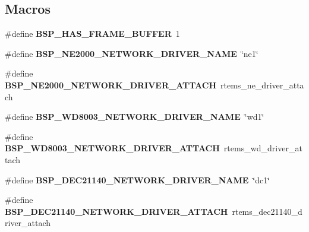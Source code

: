 \subsection*{Macros}
\begin{DoxyCompactItemize}
\item 
\mbox{\label{group__RTEMSBSPsI386_ga18988f05911c2a1adcea89019029280b}} 
\#define {\bfseries B\+S\+P\+\_\+\+H\+A\+S\+\_\+\+F\+R\+A\+M\+E\+\_\+\+B\+U\+F\+F\+ER}~1
\item 
\mbox{\label{group__RTEMSBSPsI386_gac6c911dfcfde7c091f015e594985edd4}} 
\#define {\bfseries B\+S\+P\+\_\+\+N\+E2000\+\_\+\+N\+E\+T\+W\+O\+R\+K\+\_\+\+D\+R\+I\+V\+E\+R\+\_\+\+N\+A\+ME}~\char`\"{}ne1\char`\"{}
\item 
\mbox{\label{group__RTEMSBSPsI386_ga692f56bd01099425e29a1ff59164c65f}} 
\#define {\bfseries B\+S\+P\+\_\+\+N\+E2000\+\_\+\+N\+E\+T\+W\+O\+R\+K\+\_\+\+D\+R\+I\+V\+E\+R\+\_\+\+A\+T\+T\+A\+CH}~rtems\+\_\+ne\+\_\+driver\+\_\+attach
\item 
\mbox{\label{group__RTEMSBSPsI386_gab8c3482218e42840b0e7b53f92565ea3}} 
\#define {\bfseries B\+S\+P\+\_\+\+W\+D8003\+\_\+\+N\+E\+T\+W\+O\+R\+K\+\_\+\+D\+R\+I\+V\+E\+R\+\_\+\+N\+A\+ME}~\char`\"{}wd1\char`\"{}
\item 
\mbox{\label{group__RTEMSBSPsI386_ga65d37cd2441e3d6df5c8a2454f5909cb}} 
\#define {\bfseries B\+S\+P\+\_\+\+W\+D8003\+\_\+\+N\+E\+T\+W\+O\+R\+K\+\_\+\+D\+R\+I\+V\+E\+R\+\_\+\+A\+T\+T\+A\+CH}~rtems\+\_\+wd\+\_\+driver\+\_\+attach
\item 
\mbox{\label{group__RTEMSBSPsI386_ga5f31211508964818dedb8e650d54eb7f}} 
\#define {\bfseries B\+S\+P\+\_\+\+D\+E\+C21140\+\_\+\+N\+E\+T\+W\+O\+R\+K\+\_\+\+D\+R\+I\+V\+E\+R\+\_\+\+N\+A\+ME}~\char`\"{}dc1\char`\"{}
\item 
\mbox{\label{group__RTEMSBSPsI386_gad7d7b416cfad129dcc5ea51c050a198c}} 
\#define {\bfseries B\+S\+P\+\_\+\+D\+E\+C21140\+\_\+\+N\+E\+T\+W\+O\+R\+K\+\_\+\+D\+R\+I\+V\+E\+R\+\_\+\+A\+T\+T\+A\+CH}~rtems\+\_\+dec21140\+\_\+driver\+\_\+attach
\item 
\mbox{\label{group__RTEMSBSPsI386_ga5c076a76a7492349c0ae924c4b0c5546}} 

\end{DoxyCompactItemize}
